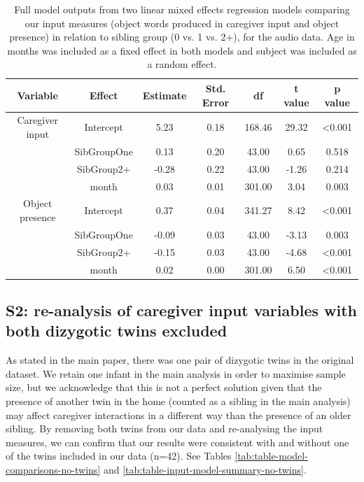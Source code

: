 \documentclass[
  man,mask,floatsintext]{apa6}
\begin{document}
\begin{longtable}[t]{ccccccc}
\caption{\label{tab:table-input-model-summary-audio}Full model outputs from two linear mixed effects regression models comparing our input measures (object words produced in caregiver input and object presence) in relation to sibling group (0 vs. 1 vs. 2+), for the audio data. Age in months was included as a fixed effect in both models and subject was included as a random effect.}\\
\toprule
Variable & Effect & Estimate & Std. Error & df & t value & p value\\
\midrule
Caregiver input & Intercept & 5.23 & 0.18 & 168.46 & 29.32 & <0.001\\
 & SibGroupOne & 0.13 & 0.20 & 43.00 & 0.65 & 0.518\\
 & SibGroup2+ & -0.28 & 0.22 & 43.00 & -1.26 & 0.214\\
 & month & 0.03 & 0.01 & 301.00 & 3.04 & 0.003\\
\midrule
Object presence & Intercept & 0.37 & 0.04 & 341.27 & 8.42 & <0.001\\
\addlinespace
 & SibGroupOne & -0.09 & 0.03 & 43.00 & -3.13 & 0.003\\
 & SibGroup2+ & -0.15 & 0.03 & 43.00 & -4.68 & <0.001\\
 & month & 0.02 & 0.00 & 301.00 & 6.50 & <0.001\\
\bottomrule
\end{longtable}

\newpage

\hypertarget{s2-re-analysis-of-caregiver-input-variables-with-both-dizygotic-twins-excluded}{%
\subsection{S2: re-analysis of caregiver input variables with both dizygotic twins excluded}\label{s2-re-analysis-of-caregiver-input-variables-with-both-dizygotic-twins-excluded}}

As stated in the main paper, there was one pair of dizygotic twins in the original dataset. We retain one infant in the main analysis in order to maximise sample size, but we acknowledge that this is not a perfect solution given that the presence of another twin in the home (counted as a sibling in the main analysis) may affect caregiver interactions in a different way than the presence of an older sibling. By removing both twins from our data and re-analysing the input measures, we can confirm that our results were consistent with and without one of the twins included in our data (n=42). See Tables \ref{tab:table-model-comparisons-no-twins} and \ref{tab:table-input-model-summary-no-twins}.
\end{document}
